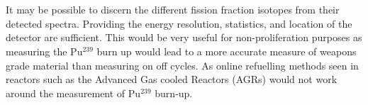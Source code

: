 \\\\It may be possible to discern the different fission fraction isotopes from their detected spectra. Providing the energy resolution, statistics, and location of the detector are sufficient. This would be very useful for non-proliferation purposes as measuring the Pu$^{239}$ burn up would lead to a more accurate measure of weapons grade material than measuring on off cycles. As online refuelling methods seen in reactors such as the Advanced Gas cooled Reactors (AGRs) would not work around the measurement of Pu$^{239}$ burn-up. 



\ifpdf
    \graphicspath{{Chapter1/Figs/Raster/}{Chapter1/Figs/PDF/}{Chapter1/Figs/}}
\else
    \graphicspath{{Chapter1/Figs/Vector/}{Chapter1/Figs/}}
\fi




